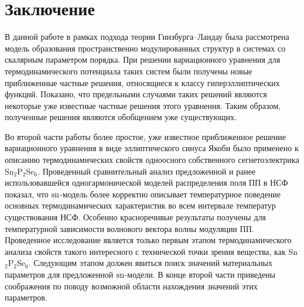 
\chapter{Заключение}\label{ch:outro}

В данной работе в рамках подхода теории Гинзбурга--Ландау была рассмотрена модель образования пространственно модулированных структур в системах со скалярным параметром порядка.
При решении вариационного уравнения для термодинамического потенциала таких систем были получены новые приближенные частные решения, относящиеся к классу гиперэллиптических функций.
Показано, что предельными случаями таких решений являются некоторые уже известные частные решения этого уравнения.
Таким образом, полученные решения являются обобщением уже существующих.

Во второй части работы более простое, уже известное приближенное решение вариационного уравнения в виде эллиптического синуса Якоби было применено к описанию термодинамических свойств одноосного собственного сегнетоэлектрика Sn$_2$P$_2$Se$_6$.
Проведенный сравнительный анализ предложенной и ранее использовавшейся одногармонической моделей распределения поля ПП в НСФ показал, что $\operatorname{sn}$-модель более корректно описывает температурное поведение основных термодинамических характеристик во всем интервале температур существования НСФ.
Особенно красноречивые результаты получены для температурной зависимости волнового вектора волны модуляции ПП.
Проведенное исследование является только первым этапом термодинамического анализа свойств такого интересного с технической точки зрения вещества, как Sn$_2$P$_2$Se$_6$.
Следующим этапом должен явиться поиск значений материальных параметров для предложенной $\operatorname{sn}$-модели.
В конце второй части приведены соображения по поводу возможной области нахождения значений этих параметров.